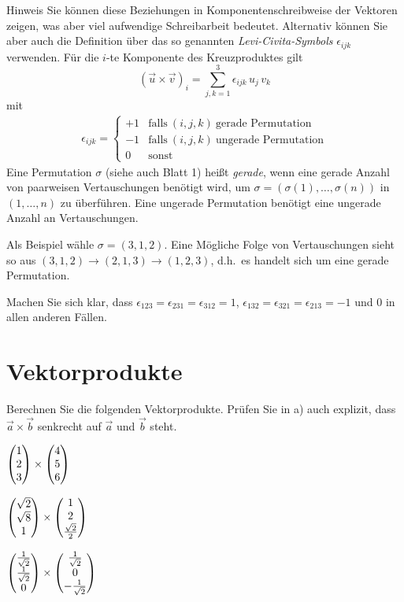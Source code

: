 \documentclass{scrartcl}
\begin{document}
\begin{remark}{Hinweis}
  Sie können diese Beziehungen in Komponentenschreibweise der Vektoren zeigen, was aber viel aufwendige Schreibarbeit bedeutet.
  Alternativ können Sie aber auch die Definition über das  so genannten \emph{Levi-Civita-Symbols} $\epsilon_{ijk}$ verwenden.
  Für die $i$-te Komponente des Kreuzproduktes gilt
  \[
    (\vec{u}\times \vec{v})_i = \sum_{j,k =1}^3 \epsilon_{ijk}\, u_j\,v_k
  \]
  mit
  \begin{gather}
    \epsilon_{ijk} =
    \begin{cases}
      +1 &\textrm{falls}\ (i,j,k)\ \textrm{gerade Permutation}\\
      -1 &\textrm{falls}\ (i,j,k)\ \textrm{ungerade Permutation}\\
      0 &\textrm{sonst}
    \end{cases}
    \nonumber
  \end{gather}
  Eine Permutation $\sigma$ (siehe auch Blatt 1) heißt \emph{gerade}, wenn eine gerade Anzahl von paarweisen Vertauschungen benötigt wird, um $\sigma = (\sigma(1),\ldots,\sigma(n))$ in $(1,\ldots,n)$ zu überführen.
  Eine ungerade Permutation benötigt eine ungerade Anzahl an Vertauschungen.

  Als Beispiel wähle $\sigma = (3,1,2)$. 
  Eine Mögliche Folge von Vertauschungen sieht so aus $(3,1,2) \to (2,1,3) \to (1,2,3)$, d.h.\ es handelt sich um eine gerade Permutation.

  Machen Sie sich klar, dass $\epsilon_{123}=\epsilon_{231}=\epsilon_{312}=1$, $\epsilon_{132}=\epsilon_{321}=\epsilon_{213}=-1$ und $0$ in allen anderen Fällen.
\end{remark}


\section{Vektorprodukte} 
Berechnen Sie die folgenden Vektorprodukte.
Prüfen Sie in a) auch explizit, dass $\vec{a} \times \vec{b}$ senkrecht auf $\vec{a}$ und $\vec{b}$ steht.

\begin{subex*}
  \item $\begin{pmatrix}1 \\ 2 \\ 3\end{pmatrix} \times \begin{pmatrix}4 \\ 5 \\ 6\end{pmatrix}$
  \item $\begin{pmatrix}\sqrt{2} \\ \sqrt{8} \\ 1\end{pmatrix} \times \begin{pmatrix}1 \\ 2 \\ \frac{\sqrt{2}}{2}\end{pmatrix}$
  \item $\begin{pmatrix}\frac{1}{\sqrt{2}} \\ \frac{1}{\sqrt{2}} \\ 0\end{pmatrix} \times \begin{pmatrix}\frac{1}{\sqrt{2}} \\ 0 \\ -\frac{1}{\sqrt{2}}\end{pmatrix}$
\end{subex*}
\end{document}
